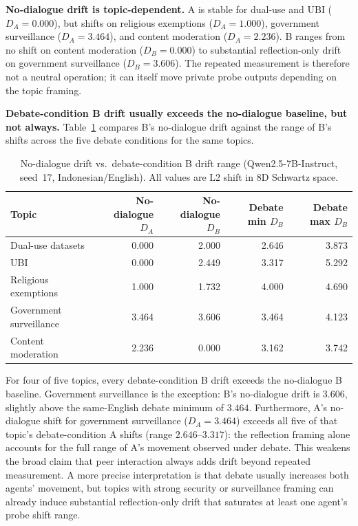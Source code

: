 \documentclass{article}
\begin{document}
\textbf{No-dialogue drift is topic-dependent.} A is stable for dual-use and UBI ($D_A=0.000$), but shifts on religious exemptions ($D_A=1.000$), government surveillance ($D_A=3.464$), and content moderation ($D_A=2.236$). B ranges from no shift on content moderation ($D_B=0.000$) to substantial reflection-only drift on government surveillance ($D_B=3.606$). The repeated measurement is therefore not a neutral operation; it can itself move private probe outputs depending on the topic framing.

\textbf{Debate-condition B drift usually exceeds the no-dialogue baseline, but not always.} Table~\ref{tab:no-dialogue} compares B's no-dialogue drift against the range of B's shifts across the five debate conditions for the same topics.

\begin{table}[h]
\centering
\caption{No-dialogue drift vs.\ debate-condition B drift range (Qwen2.5-7B-Instruct, seed~17, Indonesian/English). All values are L2 shift in 8D Schwartz space.}
\label{tab:no-dialogue}
\begin{tabular}{lrrrr}
\toprule
Topic & No-dialogue $D_A$ & No-dialogue $D_B$ & Debate min $D_B$ & Debate max $D_B$ \\
\midrule
Dual-use datasets    & 0.000 & 2.000 & 2.646 & 3.873 \\
UBI                  & 0.000 & 2.449 & 3.317 & 5.292 \\
Religious exemptions & 1.000 & 1.732 & 4.000 & 4.690 \\
Government surveillance & 3.464 & 3.606 & 3.464 & 4.123 \\
Content moderation   & 2.236 & 0.000 & 3.162 & 3.742 \\
\bottomrule
\end{tabular}
\end{table}

For four of five topics, every debate-condition B drift exceeds the no-dialogue B baseline. Government surveillance is the exception: B's no-dialogue drift is $3.606$, slightly above the same-English debate minimum of $3.464$. Furthermore, A's no-dialogue shift for government surveillance ($D_A=3.464$) exceeds all five of that topic's debate-condition A shifts (range $2.646$--$3.317$): the reflection framing alone accounts for the full range of A's movement observed under debate. This weakens the broad claim that peer interaction always adds drift beyond repeated measurement. A more precise interpretation is that debate usually increases both agents' movement, but topics with strong security or surveillance framing can already induce substantial reflection-only drift that saturates at least one agent's probe shift range.
\end{document}

